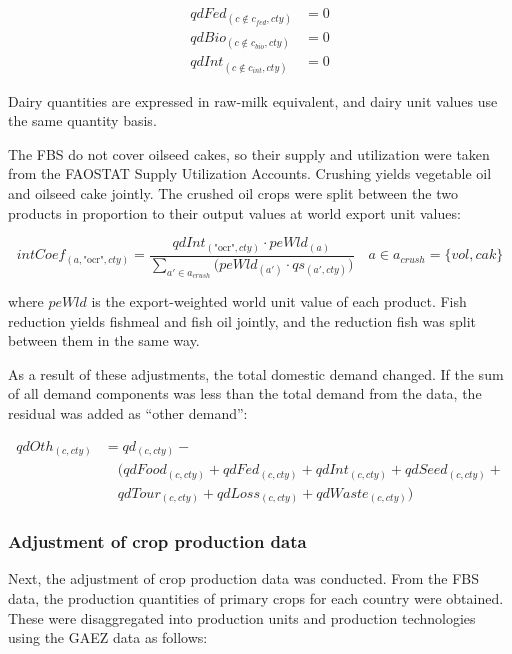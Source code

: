 \begin{align}
qdFed_{(c \notin c_{fed},cty)} &= 0 \\
qdBio_{(c \notin c_{bio},cty)} &= 0 \\
qdInt_{(c \notin c_{int},cty)} &= 0
\end{align}

Dairy quantities are expressed in raw-milk equivalent, and dairy unit values use the same quantity basis.

The FBS do not cover oilseed cakes, so their supply and utilization were taken from the FAOSTAT Supply Utilization Accounts. 
Crushing yields vegetable oil and oilseed cake jointly. 
The crushed oil crops were split between the two products in proportion to their output values at world export unit values:

\begin{equation}
intCoef_{(a,\text{"ocr"},cty)} = \frac{qdInt_{(\text{"ocr"},cty)} \cdot peWld_{(a)}}{\sum_{a' \in a_{crush}} \bigl(peWld_{(a')} \cdot qs_{(a',cty)}\bigr)}
\quad a \in a_{crush} = \{vol, cak\}
\end{equation}

where \( peWld \) is the export-weighted world unit value of each product.
Fish reduction yields fishmeal and fish oil jointly, and the reduction fish was split between them in the same way.

As a result of these adjustments, the total domestic demand changed. 
If the sum of all demand components was less than the total demand from the data, 
the residual was added as “other demand”:

\begin{align}
qdOth_{(c,cty)} &= qd_{(c,cty)} -
  \nonumber\\[-0.3em]
  &\quad
  \big(qdFood_{(c,cty)} + qdFed_{(c,cty)} + qdInt_{(c,cty)} + qdSeed_{(c,cty)} +
  \nonumber\\[-0.3em]
  &\quad
  qdTour_{(c,cty)} + qdLoss_{(c,cty)} + qdWaste_{(c,cty)}\big)
\end{align}

\subsubsection{Adjustment of crop production data}
Next, the adjustment of crop production data was conducted. 
From the FBS data, the production quantities of primary crops for each country were obtained. 
These were disaggregated into production units and production technologies using the GAEZ data as follows:

